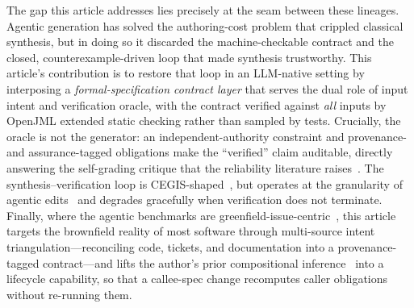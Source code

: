 The gap this article addresses lies precisely at the seam between these lineages. Agentic generation has solved the authoring-cost problem that crippled classical synthesis, but in doing so it discarded the machine-checkable contract and the closed, counterexample-driven loop that made synthesis trustworthy. This article's contribution is to restore that loop in an LLM-native setting by interposing a \emph{formal-specification contract layer} that serves the dual role of input intent and verification oracle, with the contract verified against \emph{all} inputs by OpenJML extended static checking rather than sampled by tests. Crucially, the oracle is not the generator: an independent-authority constraint and provenance- and assurance-tagged obligations make the ``verified'' claim auditable, directly answering the self-grading critique that the reliability literature raises~\cite{liu2023evalplus,zhang2025hallucination}. The synthesis--verification loop is CEGIS-shaped~\cite{solarlezama2008sketching}, but operates at the granularity of agentic edits~\cite{yang2024sweagent,zhang2024autocoderover} and degrades gracefully when verification does not terminate. Finally, where the agentic benchmarks are greenfield-issue-centric~\cite{jimenez2024swebench}, this article targets the brownfield reality of most software through multi-source intent triangulation---reconciling code, tickets, and documentation into a provenance-tagged contract---and lifts the author's prior compositional inference~\cite{edmonds_article3} into a lifecycle capability, so that a callee-spec change recomputes caller obligations without re-running them.
